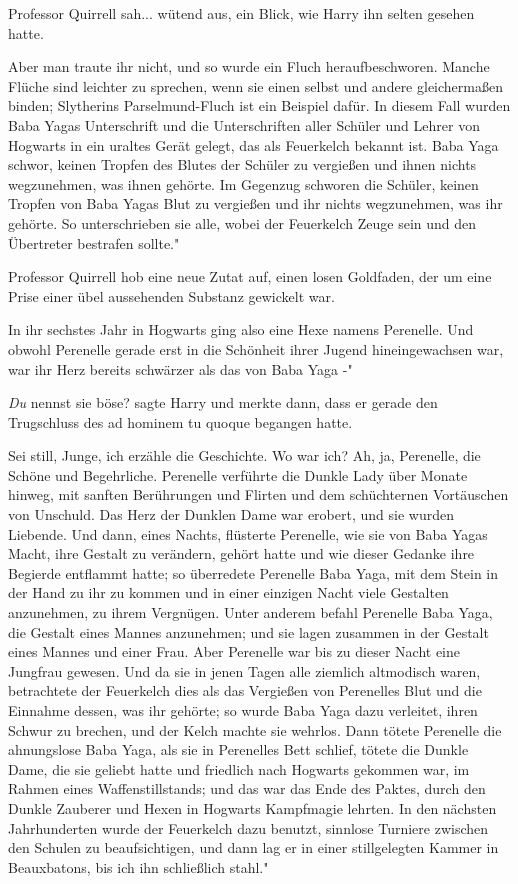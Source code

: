 Professor Quirrell sah... wütend aus, ein Blick, wie Harry ihn selten gesehen
hatte.

\glqq Aber man traute ihr nicht, und so wurde ein Fluch heraufbeschworen. Manche
Flüche sind leichter zu sprechen, wenn sie einen selbst und andere gleichermaßen
binden; Slytherins Parselmund-Fluch ist ein Beispiel dafür. In diesem Fall
wurden Baba Yagas Unterschrift und die Unterschriften aller Schüler und Lehrer
von Hogwarts in ein uraltes Gerät gelegt, das als Feuerkelch bekannt ist. Baba
Yaga schwor, keinen Tropfen des Blutes der Schüler zu vergießen und ihnen nichts
wegzunehmen, was ihnen gehörte. Im Gegenzug schworen die Schüler, keinen Tropfen
von Baba Yagas Blut zu vergießen und ihr nichts wegzunehmen, was ihr gehörte. So
unterschrieben sie alle, wobei der Feuerkelch Zeuge sein und den Übertreter
bestrafen sollte."

Professor Quirrell hob eine neue Zutat auf, einen losen Goldfaden, der um eine
Prise einer übel aussehenden Substanz gewickelt war.

\glqq In ihr sechstes Jahr in Hogwarts ging also eine Hexe namens Perenelle. Und
obwohl Perenelle gerade erst in die Schönheit ihrer Jugend hineingewachsen war,
war ihr Herz bereits schwärzer als das von Baba Yaga -"

\glqq \emph{Du} nennst sie böse?\grqq{} sagte Harry und merkte dann, dass er
gerade den Trugschluss des ad hominem tu quoque begangen hatte.

\glqq Sei still, Junge, ich erzähle die Geschichte. Wo war ich? Ah, ja,
Perenelle, die Schöne und Begehrliche. Perenelle verführte die Dunkle Lady über
Monate hinweg, mit sanften Berührungen und Flirten und dem schüchternen
Vortäuschen von Unschuld. Das Herz der Dunklen Dame war erobert, und sie wurden
Liebende. Und dann, eines Nachts, flüsterte Perenelle, wie sie von Baba Yagas
Macht, ihre Gestalt zu verändern, gehört hatte und wie dieser Gedanke ihre
Begierde entflammt hatte; so überredete Perenelle Baba Yaga, mit dem Stein in
der Hand zu ihr zu kommen und in einer einzigen Nacht viele Gestalten
anzunehmen, zu ihrem Vergnügen. Unter anderem befahl Perenelle Baba Yaga, die
Gestalt eines Mannes anzunehmen; und sie lagen zusammen in der Gestalt eines
Mannes und einer Frau. Aber Perenelle war bis zu dieser Nacht eine Jungfrau
gewesen. Und da sie in jenen Tagen alle ziemlich altmodisch waren, betrachtete
der Feuerkelch dies als das Vergießen von Perenelles Blut und die Einnahme
dessen, was ihr gehörte; so wurde Baba Yaga dazu verleitet, ihren Schwur zu
brechen, und der Kelch machte sie wehrlos. Dann tötete Perenelle die ahnungslose
Baba Yaga, als sie in Perenelles Bett schlief, tötete die Dunkle Dame, die sie
geliebt hatte und friedlich nach Hogwarts gekommen war, im Rahmen eines
Waffenstillstands; und das war das Ende des Paktes, durch den Dunkle Zauberer
und Hexen in Hogwarts Kampfmagie lehrten. In den nächsten Jahrhunderten wurde
der Feuerkelch dazu benutzt, sinnlose Turniere zwischen den Schulen zu
beaufsichtigen, und dann lag er in einer stillgelegten Kammer in Beauxbatons,
bis ich ihn schließlich stahl."

